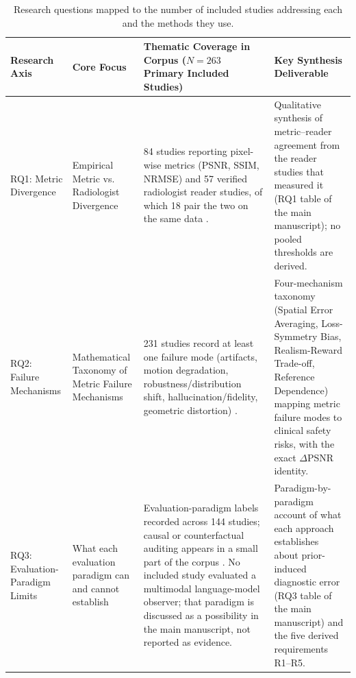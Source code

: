 \documentclass[11pt]{article}
\begin{document}
\begin{table}[t]
\centering
\caption{Research questions mapped to the number of included studies addressing each and the methods they use.}
\label{tab:evidence_architecture}
\small
\setlength{\tabcolsep}{4pt}
\renewcommand{\arraystretch}{1.18}
\begin{tabular}{p{} p{} p{} p{}}
\hline
\textbf{Research Axis} & \textbf{Core Focus} & \textbf{Thematic Coverage in Corpus ($N=263$ Primary Included Studies)} & \textbf{Key Synthesis Deliverable} \\
\hline
RQ1: Metric Divergence & Empirical Metric vs. Radiologist Divergence & 84 studies reporting pixel-wise metrics (PSNR, SSIM, NRMSE) and 57 verified radiologist reader studies, of which 18 pair the two on the same data \cite{muckley2021results,lang2024ultrafast,tang2025incorporating}. & Qualitative synthesis of metric--reader agreement from the reader studies that measured it (RQ1 table of the main manuscript); no pooled thresholds are derived. \\
\hline
RQ2: Failure Mechanisms & Mathematical Taxonomy of Metric Failure Mechanisms & 231 studies record at least one failure mode (artifacts, motion degradation, robustness/distribution shift, hallucination/fidelity, geometric distortion) \cite{tang2025incorporating,khawaled2024npbrec,zhou2024adversarial}. & Four-mechanism taxonomy (Spatial Error Averaging, Loss-Symmetry Bias, Realism-Reward Trade-off, Reference Dependence) mapping metric failure modes to clinical safety risks, with the exact $\Delta$PSNR identity. \\
\hline
RQ3: Evaluation-Paradigm Limits & What each evaluation paradigm can and cannot establish & Evaluation-paradigm labels recorded across 144 studies; causal or counterfactual auditing appears in a small part of the corpus \cite{pawlowski2020deep,gngr2023adaptive,wei2026latent}. No included study evaluated a multimodal language-model observer; that paradigm is discussed as a possibility in the main manuscript, not reported as evidence. & Paradigm-by-paradigm account of what each approach establishes about prior-induced diagnostic error (RQ3 table of the main manuscript) and the five derived requirements R1--R5. \\
\hline
\end{tabular}
\end{table}

\end{document}
